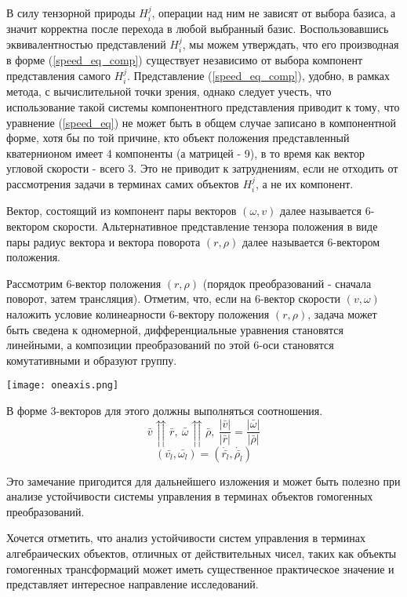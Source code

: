 В силу тензорной природы $H^j_i$, операции над ним не зависят от выбора базиса, а значит корректна после перехода в любой выбранный базис. Воспользовавшись эквивалентностью представлений $H^j_i$, мы можем утверждать, что его производная в форме (\ref{speed_eq_comp}) существует независимо от выбора компонент представления самого $H^j_i$. Представление (\ref{speed_eq_comp}), удобно, в рамках метода, с вычислительной точки зрения, однако следует учесть, что использование такой системы компонентного представления приводит к тому, что уравнение (\ref{speed_eq}) не может быть в общем случае записано в компонентной форме, хотя бы по той причине, кто объект положения представленный кватернионом имеет 4 компоненты (а матрицей - 9), в то время как вектор угловой скорости - всего 3. Это не приводит к затруднениям, если не отходить от рассмотрения задачи в терминах самих объектов $H^j_i$, а не их компонент.

Вектор, состоящий из компонент пары векторов $(\omega, v)$ далее называется 6-вектором скорости. Альтернативное представление тензора положения в виде пары радиус вектора и вектора поворота $(r,\rho)$ далее называется 6-вектором положения.

Рассмотрим 6-вектор положения $(r,\rho)$ (порядок преобразований - сначала поворот, затем трансляция). Отметим, что, если на 6-вектор скорости $(v,\omega)$ наложить условие колинеарности 6-вектору положения $(r,\rho)$, задача может быть сведена к одномерной, дифференциальные уравнения становятся линейными, а композиции преобразований по этой 6-оси становятся комутативными и образуют группу. 
\begin{center}
  \texttt{[image: oneaxis.png]}
  \label{}
\end{center}

В форме 3-векторов для этого должны выполняться соотношения.
\begin{equation}\label{} 
\bar{v} \upuparrows \bar{r}, \  \bar{\omega} \upuparrows \bar{\rho}, \  \frac{|\bar{v}|}{|\bar{r}|} = \frac{|\bar{\omega}|}{|\bar{\rho}|} 
\end{equation}
\begin{equation}
(\bar{v_l},\bar{\omega_l}) = (\dot{\bar{r_l}},\dot{\bar{\rho_l}})
\end{equation}

Это замечание пригодится для дальнейшего изложения и может быть полезно при анализе устойчивости системы управления в терминах объектов гомогенных преобразований. 

Хочется отметить, что анализ устойчивости систем управления в терминах алгебраических объектов, отличных от действительных чисел, таких как объекты гомогенных трансформаций может иметь существенное практическое значение и представляет интересное направление исследований.